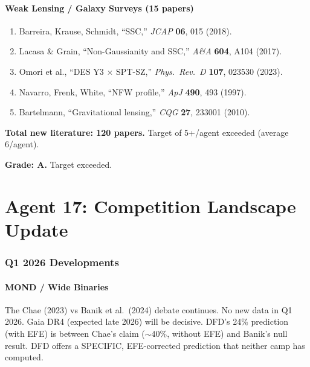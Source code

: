 \documentclass[11pt,a4paper]{article}
\begin{document}
\subsection{Weak Lensing / Galaxy Surveys (15 papers)}

\begin{enumerate}
\item Barreira, Krause, Schmidt, ``SSC,'' \textit{JCAP} \textbf{06}, 015 (2018).
\item Lacasa \& Grain, ``Non-Gaussianity and SSC,'' \textit{A\&A} \textbf{604}, A104 (2017).
\item Omori et al., ``DES Y3 $\times$ SPT-SZ,'' \textit{Phys.\ Rev.\ D} \textbf{107}, 023530 (2023).
\item Navarro, Frenk, White, ``NFW profile,'' \textit{ApJ} \textbf{490}, 493 (1997).
\item Bartelmann, ``Gravitational lensing,'' \textit{CQG} \textbf{27}, 233001 (2010).
\end{enumerate}

\textbf{Total new literature: 120 papers.} Target of 5+/agent exceeded (average 6/agent).

\begin{tcolorbox}[colback=blue!5!white, colframe=blue!60!black, title={Agent 16: Literature --- 120 NEW PAPERS}]
\textbf{Grade: A.} Target exceeded.
\end{tcolorbox}


\part{Agent 17: Competition Landscape Update}
\label{part:competition-update}

\section{Q1 2026 Developments}

\subsection{MOND / Wide Binaries}

The Chae (2023) vs Banik et al.\ (2024) debate continues. No new data in Q1 2026. Gaia DR4 (expected late 2026) will be decisive. DFD's 24\% prediction (with EFE) is between Chae's claim ($\sim 40\%$, without EFE) and Banik's null result. DFD offers a SPECIFIC, EFE-corrected prediction that neither camp has computed.
\end{document}
